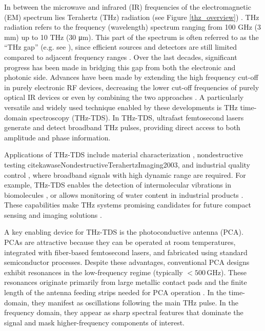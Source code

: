 In between the microwave and infrared (IR) frequencies of the electromagnetic (EM) spectrum lies Terahertz (THz) radiation (see Figure \ref{thz_overview}) \cite{zhangIntroductionTHzWave2010}. THz radiation refers to the frequency (wavelength) spectrum ranging from \num{100} \si{\giga\hertz} (\num{3} \si{\milli\meter}) up to \num{10} \si{\tera\hertz} (\num{30} \si{\micro\meter}). 
This part of the spectrum is often referred to as the \enquote{THz gap} (e.g. see \cite{dhillon2017TerahertzScience2017, williamsFillingTHzGap2006, zhangAdvancesTerahertzTechnology2021}), since efficient sources and detectors are still limited compared to adjacent frequency ranges \cite{perkowitzNavigatingTerahertzGap2020}. Over the last decades, significant progress has been made in bridging this gap from both the electronic and photonic side. Advances have been made by extending the high frequency cut-off in purely electronic RF devices, decreasing the lower cut-off frequencies of purely optical IR devices or even by combining the two approaches \cite{preuTunableContinuouswaveTerahertz2011}. A particularly versatile and widely used technique enabled by these developments is THz time-domain spectroscopy (THz-TDS). In THz-TDS, ultrafast femtosecond lasers generate and detect broadband THz pulses, providing direct access to both amplitude and phase information.

Applications of THz-TDS include material characterization \cite{zhangApplicationTHzTDSCharacterization2024}, nondestructive testing cite{kawaseNondestructiveTerahertzImaging2003}, and industrial quality control \cite{prokschaTerahertzInsightsFabric2024, wietzkeTerahertzSpectroscopyPolymers2011}, where broadband signals with high dynamic range are required. For example, THz-TDS enables the detection of intermolecular vibrations in biomolecules \cite{chenLargeOxidationDependence2005,waltherNoncovalentIntermolecularForces2003,fischerTerahertzTimedomainSpectroscopy2005, nagaiDirectEvidenceIntermolecular2005}, or allows monitoring of water content in industrial products \cite{PrinciplesTerahertzScience2009, THzSecurityApplications}. These capabilities make THz systems promising candidates for future compact sensing and imaging solutions \cite{daviesTerahertzSpectroscopyExplosives2008,fischerTerahertzTimedomainSpectroscopy2005,leitenstorfer2023TerahertzScience2023,yangBiomedicalApplicationsTerahertz2016}.

A key enabling device for THz-TDS is the photoconductive antenna (PCA). PCAs are attractive because they can be operated at room temperatures, integrated with fiber-based femtosecond lasers, and fabricated using standard semiconductor processes. Despite these advantages, conventional PCA designs exhibit resonances in the low-frequency regime (typically $< 500$\,\si{\giga \hertz}). These resonances originate primarily from large metallic contact pads and the finite length of the antenna feeding strips needed for PCA operation \cite{nandiErAsInAlGaAsPhotoconductors2021}. In the time-domain, they manifest as oscillations following the main THz pulse. In the frequency domain, they appear as sharp spectral features that dominate the signal and mask higher-frequency components of interest.


